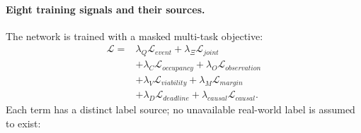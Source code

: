 \documentclass[letterpaper]{article} %
\begin{document}
\paragraph{Eight training signals and their sources.}
The network is trained with a masked multi-task objective:
\begin{equation}
\begin{aligned}
\mathcal L={}&\lambda_Q\mathcal L_{event}+\lambda_\Xi\mathcal L_{joint}\\
&+\lambda_C\mathcal L_{occupancy}+\lambda_O\mathcal L_{observation}\\
&+\lambda_V\mathcal L_{viability}+\lambda_M\mathcal L_{margin}\\
&+\lambda_D\mathcal L_{deadline}+\lambda_{causal}\mathcal L_{causal}.
\end{aligned}
\label{eq:training}
\end{equation}
Each term has a distinct label source; no unavailable real-world label is assumed to exist:
\end{document}
